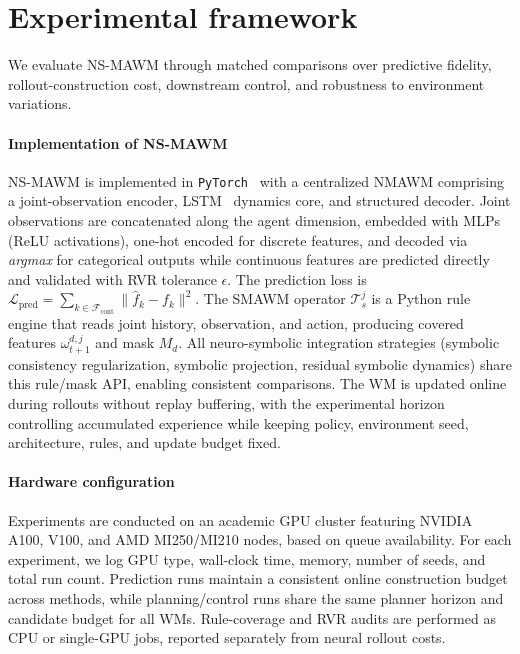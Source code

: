 \documentclass{article}
\theoremstyle{plain}
\theoremstyle{definition}
\theoremstyle{remark}
\begin{document}
\section{Experimental framework}
\label{sec:exp}

We evaluate NS-MAWM through matched comparisons over predictive fidelity, rollout-construction cost, downstream control, and robustness to environment variations.

\paragraph{Implementation of NS-MAWM}
\label{sec:impl_overview}


NS-MAWM\hyperref[fn:github]{\footnotemark[1]} is implemented in \texttt{PyTorch}~\cite{paszke2019pytorch} with a centralized NMAWM comprising a joint-observation encoder, LSTM~\cite{hochreiter1997long} dynamics core, and structured decoder. Joint observations are concatenated along the agent dimension, embedded with MLPs (ReLU activations), one-hot encoded for discrete features, and decoded via \textit{argmax} for categorical outputs while continuous features are predicted directly and validated with RVR tolerance $\epsilon$. The prediction loss is $\mathcal{L}_{\mathrm{pred}} = \sum_{k \in \mathcal{F}_{\mathrm{cont}}} \|\hat{f}_k-f_k\|^2$. The SMAWM operator $\mathcal{T}^j_s$ is a Python rule engine that reads joint history, observation, and action, producing covered features $\omega^{d,j}_{t+1}$ and mask $M_d$. All neuro-symbolic integration strategies (symbolic consistency regularization, symbolic projection, residual symbolic dynamics) share this rule/mask API, enabling consistent comparisons. The WM is updated online during rollouts without replay buffering, with the experimental horizon controlling accumulated experience while keeping policy, environment seed, architecture, rules, and update budget fixed.

\paragraph{Hardware configuration}
\label{sec:hardware}

Experiments are conducted on an academic GPU cluster featuring NVIDIA A100, V100, and AMD MI250/MI210 nodes, based on queue availability. For each experiment, we log GPU type, wall-clock time, memory, number of seeds, and total run count. Prediction runs maintain a consistent online construction budget across methods, while planning/control runs share the same planner horizon and candidate budget for all WMs. Rule-coverage and RVR audits are performed as CPU or single-GPU jobs, reported separately from neural rollout costs.
\end{document}
